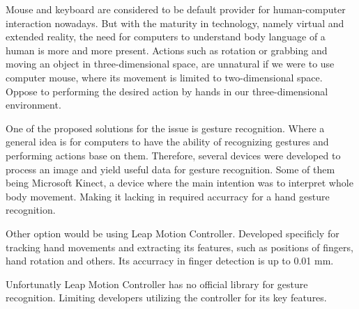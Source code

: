 Mouse and keyboard are considered to be default provider for human-computer interaction nowadays. But with the maturity in technology, namely virtual and extended reality, the need for computers to understand body language of a human is more and more present. Actions such as rotation or grabbing and moving an object in three-dimensional space, are unnatural if we were to use computer mouse, where its movement is limited to two-dimensional space. Oppose to performing the desired action by hands in our three-dimensional environment.

One of the proposed solutions for the issue is gesture recognition. Where a general idea is for computers to have the ability of recognizing gestures and performing actions base on them. Therefore, several devices were developed to process an image and yield useful data for gesture recognition. Some of them being Microsoft Kinect, a device where the main intention was to interpret whole body movement. Making it lacking in required accurracy for a hand gesture recognition. 

Other option would be using Leap Motion Controller. Developed specificly for tracking hand movements and extracting its features, such as positions of fingers, hand rotation and others. Its accurracy in finger detection is up to 0.01 mm.

Unfortunatly Leap Motion Controller has no official library for gesture recognition. Limiting developers utilizing the controller for its key features.